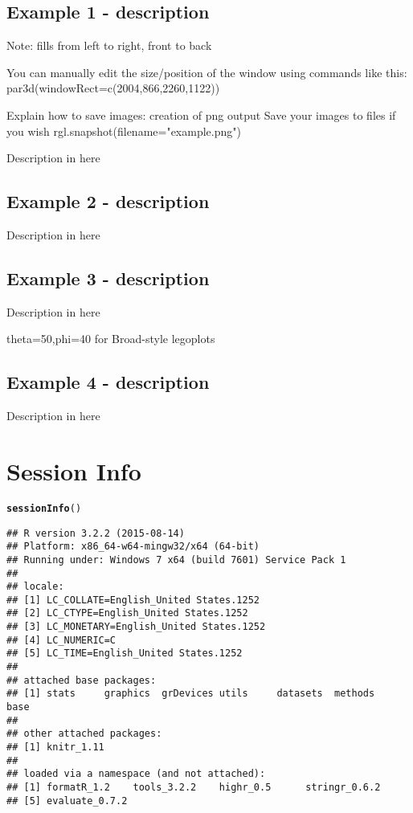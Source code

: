 \documentclass{article}\usepackage[]{graphicx}\usepackage[]{color}
\makeatletter
\newcommand{\hlstd}[1]{\textcolor[rgb]{0.345,0.345,0.345}{#1}}%
\newcommand{\hlkwd}[1]{\textcolor[rgb]{0.737,0.353,0.396}{\textbf{#1}}}%
\newenvironment{kframe}{%
 \def\at@end@of@kframe{}%
 \ifinner\ifhmode%
  \def\at@end@of@kframe{\end{minipage}}%
  \begin{minipage}{\columnwidth}%
 \fi\fi%
 \def\FrameCommand##1{\hskip\@totalleftmargin \hskip-\fboxsep
 \colorbox{shadecolor}{##1}\hskip-\fboxsep
     \hskip-\linewidth \hskip-\@totalleftmargin \hskip\columnwidth}%
 \MakeFramed {\advance\hsize-\width
   \@totalleftmargin\z@ \linewidth\hsize
   \@setminipage}}%
 {\par\unskip\endMakeFramed%
 \at@end@of@kframe}
\newenvironment{knitrout}{}{} %
\makeatother
\begin{document}
\subsection{Example 1 - description}

Note: fills from left to right, front to back 

You can manually edit the size/position of the window using commands like this:
par3d(windowRect=c(2004,866,2260,1122))

Explain how to save images:
creation of png output
Save your images to files if you wish
rgl.snapshot(filename="example.png")

Description in here
\subsection{Example 2 - description}
Description in here
\subsection{Example 3 - description}
Description in here

theta=50,phi=40 for Broad-style legoplots

\subsection{Example 4 - description}
Description in here









\section{Session Info}
\begin{knitrout}
\color{fgcolor}\begin{kframe}
\begin{alltt}
\hlkwd{sessionInfo}\hlstd{()}
\end{alltt}
\begin{verbatim}
## R version 3.2.2 (2015-08-14)
## Platform: x86_64-w64-mingw32/x64 (64-bit)
## Running under: Windows 7 x64 (build 7601) Service Pack 1
## 
## locale:
## [1] LC_COLLATE=English_United States.1252 
## [2] LC_CTYPE=English_United States.1252   
## [3] LC_MONETARY=English_United States.1252
## [4] LC_NUMERIC=C                          
## [5] LC_TIME=English_United States.1252    
## 
## attached base packages:
## [1] stats     graphics  grDevices utils     datasets  methods   base     
## 
## other attached packages:
## [1] knitr_1.11
## 
## loaded via a namespace (and not attached):
## [1] formatR_1.2    tools_3.2.2    highr_0.5      stringr_0.6.2 
## [5] evaluate_0.7.2
\end{verbatim}
\end{kframe}
\end{knitrout}

\printbibliography[heading=bibintoc] 
\end{document}
